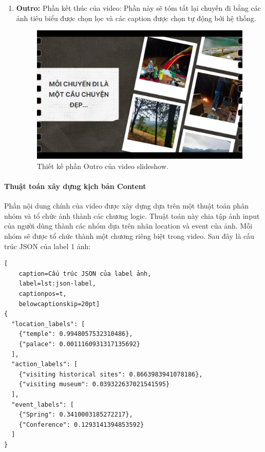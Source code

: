 \begin{enumerate}
    \item \textbf{Outro:} Phần kết thúc của video: Phần này sẽ tóm tắt lại chuyến đi bằng các ảnh tiêu biểu được chọn lọc và các caption được chọn tự động bởi hệ thống.
    
    \begin{figure}[H]
        \centering  
        \includegraphics[width=1\textwidth]{figures/c4/4_1/outro.jpg}
        \caption{Thiết kế phần Outro của video slideshow.}
        \label{fig:video-outro-design}
    \end{figure}
\end{enumerate}

\paragraph{Thuật toán xây dựng kịch bản Content}
Phần nội dung chính của video được xây dựng dựa trên một thuật toán phân nhóm và tổ chức ảnh thành các chương logic. Thuật toán này chia tập ảnh input của người dùng thành các nhóm dựa trên nhãn location và event của ảnh. Mỗi nhóm sẽ được tổ chức thành một chương riêng biệt trong video. Sau đây là cấu trúc JSON của label 1 ảnh:

\newpage
\lstset{language=json}
\begin{lstlisting}[
    caption=Cấu trúc JSON của label ảnh,
    label=lst:json-label,
    captionpos=t,
    belowcaptionskip=20pt]
{
  "location_labels": [
    {"temple": 0.9948057532310486},
    {"palace": 0.0011160931317135692}
  ],
  "action_labels": [
    {"visiting historical sites": 0.8663983941078186},
    {"visiting museum": 0.039322637021541595}
  ],
  "event_labels": [
    {"Spring": 0.3410003185272217},
    {"Conference": 0.1293141394853592}
  ]
}
\end{lstlisting}

